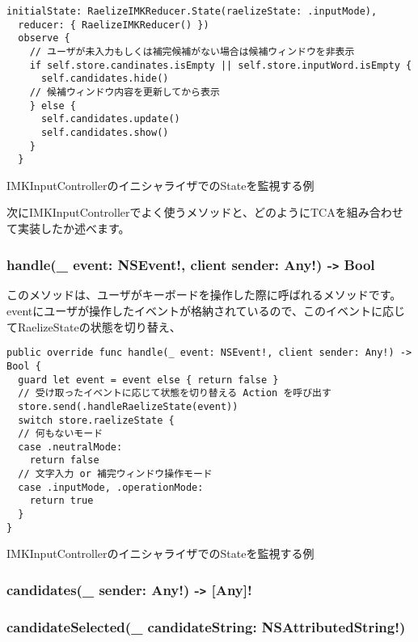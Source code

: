 \documentclass[uplatex,a4j,12pt,twocolumn]{jsarticle}
\begin{document}
\begin{listing}[H]
  \begin{verbatim}
initialState: RaelizeIMKReducer.State(raelizeState: .inputMode),
  reducer: { RaelizeIMKReducer() })
  observe {
    // ユーザが未入力もしくは補完候補がない場合は候補ウィンドウを非表示
    if self.store.candinates.isEmpty || self.store.inputWord.isEmpty {
      self.candidates.hide()
    // 候補ウィンドウ内容を更新してから表示
    } else {
      self.candidates.update()
      self.candidates.show()
    }
  }
  \end{verbatim}
  \caption{IMKInputControllerのイニシャライザでのStateを監視する例}\label{listings:initial_state}
\end{listing}
次にIMKInputControllerでよく使うメソッドと、どのようにTCAを組み合わせて実装したか述べます。
\subsubsection{handle(\_ event: NSEvent!, client sender: Any!) -\texttt{>} Bool}
このメソッドは、ユーザがキーボードを操作した際に呼ばれるメソッドです。eventにユーザが操作したイベントが格納されているので、このイベントに応じてRaelizeStateの状態を切り替え、


\begin{listing}[h]
  \begin{verbatim}
public override func handle(_ event: NSEvent!, client sender: Any!) -> Bool {
  guard let event = event else { return false }
  // 受け取ったイベントに応じて状態を切り替える Action を呼び出す
  store.send(.handleRaelizeState(event))
  switch store.raelizeState {
  // 何もないモード
  case .neutralMode:
    return false
  // 文字入力 or 補完ウィンドウ操作モード  
  case .inputMode, .operationMode:
    return true
  }
}
  \end{verbatim}
  \caption{IMKInputControllerのイニシャライザでのStateを監視する例}\label{listings:handle}
\end{listing}
\subsubsection{candidates(\_ sender: Any!) -\texttt{>} [Any]!}

\subsubsection{candidateSelected(\_ candidateString: NSAttributedString!)}
\end{document}
